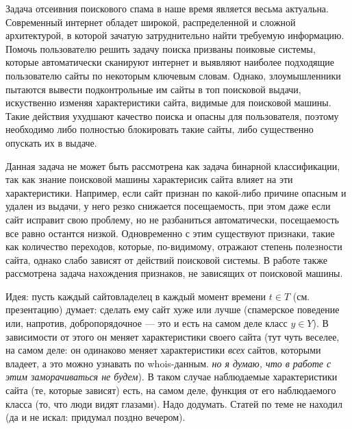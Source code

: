 Задача отсеивния поискового спама в наше время является весьма актуальна. Современный интернет обладет широкой, распределенной и сложной архитектурой, в которой зачатую затруднительно найти требуемую информацию. Помочь пользователю решить задачу поиска призваны поиковые системы, которые автоматически сканируют интернет и выявляют наиболее подходящие пользователю сайты по некоторым ключевым словам. Однако, злоумышленники пытаются вывести подконтрольные им сайты в топ поисковой выдачи, искуственно изменяя характеристики сайта, видимые для поисковой машины. Такие действия ухудшают качество поиска и опасны для пользователя, поэтому необходимо либо полностью блокировать такие сайты, либо существенно опускать их в выдаче.


Данная задача не может быть рассмотрена как задача бинарной классификации, так как знание поисковой машины характерисик сайта влияет на эти характеристики. Например, если сайт признан по какой-либо причине опасным и удален из выдачи, у него резко снижается посещаемость, при этом даже если сайт исправит свою проблему, но не разбаниться автоматически, посещаемость все равно остантся низкой. Одновременно с этим существуют признаки, такие как количество переходов, которые, по-видимому, отражают степень полезности сайта, однако слабо зависят от действий поисковой системы. В работе также рассмотрена задача нахождения признаков, не зависящих от поисковой машины.

Идея: пусть каждый сайтовладелец в каждый момент времени $t\in T$ (см. презентацию) думает: сделать ему сайт хуже или лучше (спамерское поведение или, напротив, добропорядочное --- это и есть на самом деле класс $y\in Y$). В зависимости от этого он меняет характеристики своего сайта (тут чуть веселее, на самом деле: он одинаково меняет характеристики {\it всех} сайтов, которыми владеет, а это можно узнавать по whois-данным. {\it но я думаю, что в работе с этим заморачиваться не будем}). В таком случае наблюдаемые характеристики сайта (те, которые зависят) есть, на самом деле, функция от его наблюдаемого класса (то, что люди видят глазами). Надо додумать. Статей по теме не находил (да и не искал: придумал поздно вечером).